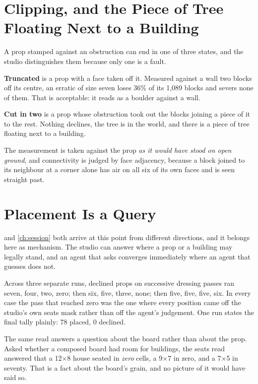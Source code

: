 \section{Clipping, and the Piece of Tree Floating Next to a Building}

A prop stamped against an obstruction can end in one of three states, and the
studio distinguishes them because only one is a fault.

\textbf{Truncated} is a prop with a face taken off it. Measured against a wall two
blocks off its centre, an erratic of size seven loses 36\% of its 1{,}089 blocks
and severs none of them. That is acceptable: it reads as a boulder against a wall.

\textbf{Cut in two} is a prop whose obstruction took out the blocks joining a piece
of it to the rest. Nothing declines, the tree is in the world, and there is a piece
of tree floating next to a building.

The measurement is taken against the prop \emph{as it would have stood on open
ground}, and connectivity is judged by face adjacency, because a block joined to
its neighbour at a corner alone has air on all six of its own faces and is seen
straight past.

\section{Placement Is a Query}

 and \cref{ch:session} both arrive at this point from different
directions, and it belongs here as mechanism. The studio can answer where a prop or
a building may legally stand, and an agent that asks converges immediately where an
agent that guesses does not.

Across three separate runs, declined props on successive dressing passes ran seven,
four, two, zero; then six, five, three, none; then five, five, five, six. In every
case the pass that reached zero was the one where every position came off the
studio's own seats mask rather than off the agent's judgement. One run states the
final tally plainly: 78 placed, 0 declined.

The same read answers a question about the board rather than about the prop. Asked
whether a composed board had room for buildings, the seats read answered that a
12$\times$8 house seated in \emph{zero} cells, a 9$\times$7 in zero, and a
7$\times$5 in seventy. That is a fact about the board's grain, and no picture of it
would have said so.

